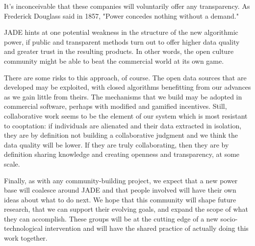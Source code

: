 \documentclass{sigchi-ext}
\begin{document}
It's inconceivable that these companies will voluntarily offer any transparency.  As Frederick Douglass said in 1857, "Power concedes nothing without a demand."

JADE hints at one potential weakness in the structure of the new algorithmic power, if public and transparent methods turn out to offer higher data quality and greater trust in the resulting products.  In other words, the open culture community might be able to beat the commercial world at its own game.

There are some risks to this approach, of course.  The open data sources that are developed may be exploited, with closed algorithms benefitting from our advances as we gain little from theirs.  The mechanisms that we build may be adopted in commercial software, perhaps with modified and gamified incentives.  Still, collaborative work seems to be the element of our system which is most resistant to cooptation: if individuals are alienated and their data extracted in isolation, they are by definition not building a collaborative judgment and we think the data quality will be lower.  If they are truly collaborating, then they are by definition sharing knowledge and creating openness and transparency, at some scale.

Finally, as with any community-building project, we expect that a new power base will coalesce around JADE and that people involved will have their own ideas about what to do next.  We hope that this community will shape future research, that we can support their evolving goals, and expand the scope of what they can accomplish.  These groups will be at the cutting edge of a new socio-technological intervention and will have the shared practice of actually doing this work together.

\balance{}



\end{document}
